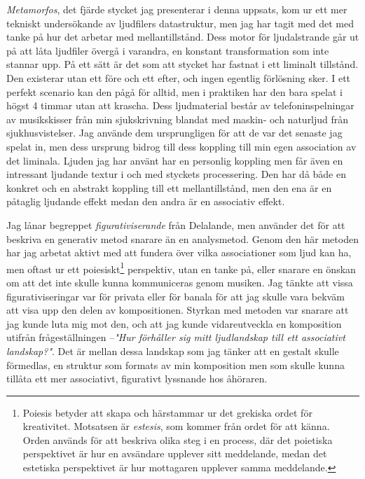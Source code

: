 \documentclass{article}
\begin{document}
\emph{Metamorfos}, det fjärde stycket jag presenterar i denna uppsats, kom ur ett mer tekniskt undersökande av
ljudfilers datastruktur, men jag har tagit med det med tanke på hur det arbetar med mellantillstånd. Dess
motor för ljudalstrande går ut på att låta ljudfiler övergå i varandra, en konstant transformation som inte
stannar upp. På ett sätt är det som att stycket har fastnat i ett liminalt tillstånd. Den existerar utan ett
före och ett efter, och ingen egentlig förlösning sker. I ett perfekt scenario kan den pågå för alltid, men i
praktiken har den bara spelat i högst 4 timmar utan att krascha. Dess ljudmaterial består av
telefoninspelningar av musikskisser från min sjukskrivning blandat med maskin- och naturljud från
sjukhusvistelser. Jag använde dem ursprungligen för att de var det senaste jag spelat in, men dess ursprung
bidrog till dess koppling till min egen association av det liminala. Ljuden jag har använt har en personlig
koppling men får även en intressant ljudande textur i och med styckets processering. Den har då både en
konkret och en abstrakt koppling till ett mellantillstånd, men den ena är en påtaglig ljudande effekt medan
den andra är en associativ effekt.

Jag lånar begreppet \emph{figurativiserande} från Delalande, men använder det för att beskriva en generativ
metod snarare än en analysmetod. Genom den här metoden har jag arbetat aktivt med att fundera över vilka
associationer som ljud kan ha, men oftast ur ett poiesiskt\footnote{Poiesis betyder att skapa och härstammar
ur det grekiska ordet för kreativitet. Motsatsen är \emph{estesis}, som kommer från ordet för att känna.
Orden används för att beskriva olika steg i en process, där det poietiska perspektivet är hur en avsändare
upplever sitt meddelande, medan det estetiska perspektivet är hur mottagaren upplever samma meddelande.}
perspektiv, utan en tanke på, eller snarare en önskan om att det inte skulle kunna kommuniceras genom musiken.
Jag tänkte att vissa figurativiseringar var för privata eller för banala för att jag skulle vara bekväm att
visa upp den delen av kompositionen. Styrkan med metoden var snarare att jag kunde luta mig mot
den, och att jag kunde vidareutveckla en komposition utifrån frågeställningen --\emph{"Hur förhåller sig mitt
ljudlandskap till ett associativt landskap?"}. Det är mellan dessa landskap som jag tänker att en gestalt
skulle förmedlas, en struktur som formats av min komposition men som skulle kunna tillåta ett mer associativt,
figurativt lyssnande hos åhöraren.


\pagebreak
\end{document}
